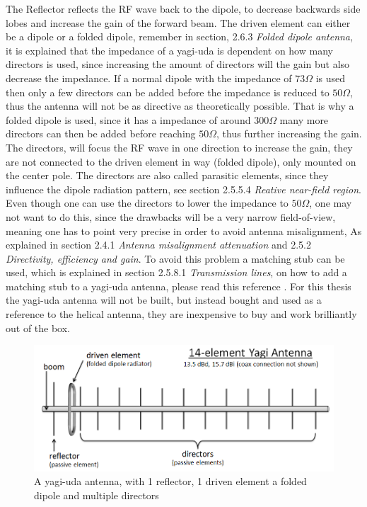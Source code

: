 The Reflector reflects the RF wave back to the dipole, to decrease backwards side lobes and increase the gain of the forward beam. The driven element can either be a dipole or a folded dipole, remember in section, 2.6.3 \textit{Folded dipole antenna}, it is explained that the impedance of a yagi-uda is dependent on how many directors is used, since increasing the amount of directors will the gain but also decrease the impedance. If a normal dipole with the impedance of $73\Omega$ is used then only a few directors can be added before the impedance is reduced to $50\Omega$, thus the antenna will not be as directive as theoretically possible. That is why a folded dipole is used, since it has a impedance of around $300\Omega$ many more directors can then be added before reaching $50\Omega$, thus further increasing the gain. The directors, will focus the RF wave in one direction to increase the gain, they are not connected to the driven element in way (folded dipole), only mounted on the center pole. The directors are also called parasitic elements, since they influence the dipole radiation pattern, see section 2.5.5.4 \textit{Reative near-field region}. Even though one can use the directors to lower the impedance to $50\Omega$, one may not want to do this, since the drawbacks will be a very narrow field-of-view, meaning one has to point very precise in order to avoid antenna misalignment, As explained in section 2.4.1 \textit{Antenna misalignment attenuation} and 2.5.2 \textit{Directivity, efficiency and gain}. To avoid this problem a matching stub can be used, which is explained in section 2.5.8.1 \textit{Transmission lines}, on how to add a matching stub to a yagi-uda antenna, please read this reference \cite{YagiMatching}. For this thesis the yagi-uda antenna will not be built, but instead bought and used as a reference to the helical antenna, they are inexpensive to buy and work brilliantly out of the box.  

\begin{figure}[h]
\centering
\includegraphics[scale=0.45]{figures/yagi-uda.png}
\caption{A yagi-uda antenna, with 1 reflector, 1 driven element a folded dipole and multiple directors\cite{YagiUda}}
\end{figure}

